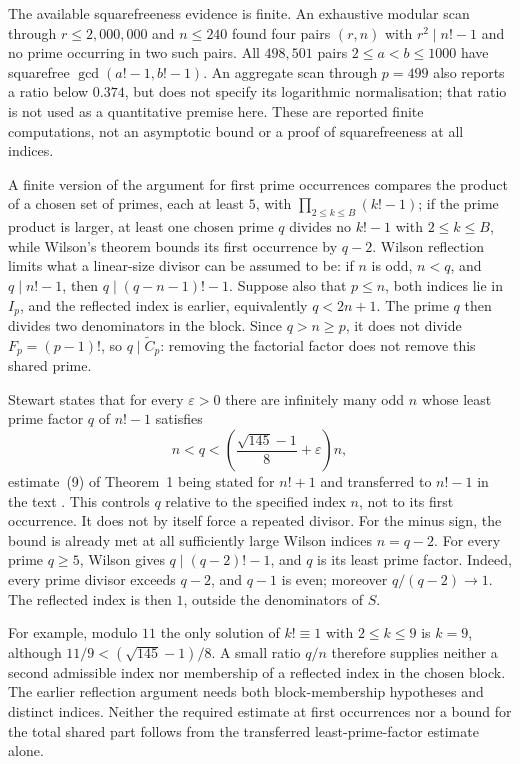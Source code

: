 \documentclass[11pt]{article}
\begin{document}
The available squarefreeness evidence is finite. An exhaustive modular scan through
$r\le2{,}000{,}000$ and $n\le240$ found four pairs $(r,n)$ with $r^2\mid n!-1$ and no
prime occurring in two such pairs.  All $498{,}501$ pairs $2\le a<b\le1000$ have
squarefree $\gcd(a!-1,b!-1)$. An aggregate scan through $p=499$ also reports a ratio below
$0.374$, but does not specify its logarithmic normalisation; that ratio is
not used as a quantitative premise here. These are reported finite
computations, not an asymptotic bound or a proof of squarefreeness at all
indices.

A finite version of the argument for first prime occurrences compares the product of a
chosen set of primes, each at least $5$, with $\prod_{2\le k\le B}(k!-1)$; if
the prime product is larger, at least one chosen prime $q$ divides no $k!-1$ with $2\le k\le B$,
while Wilson's theorem bounds its first occurrence by $q-2$.  Wilson reflection
limits what a linear-size divisor can be assumed to be: if $n$ is odd,
$n<q$, and $q\mid n!-1$, then $q\mid(q-n-1)!-1$. Suppose also that
$p\le n$, both indices lie in $I_p$, and the reflected index is earlier,
equivalently $q<2n+1$. The prime $q$ then divides two denominators in the
block. Since $q>n\ge p$, it does not divide $F_p=(p-1)!$, so
$q\mid\widetilde C_p$: removing the factorial factor does not remove this
shared prime.

Stewart states that for every $\varepsilon>0$ there are infinitely many odd
$n$ whose least prime factor $q$ of $n!-1$ satisfies
\[
 n<q<\left(\frac{\sqrt{145}-1}{8}+\varepsilon\right)n ,
\]
estimate~(9) of Theorem~1 being stated for $n!+1$ \cite[p.~463]{stewart2004}
and transferred to $n!-1$ in the text \cite[p.~464]{stewart2004}.  This controls $q$ relative to the specified index $n$, not to its first
occurrence. It does not by itself force a repeated divisor. For the minus
sign, the bound is already met at all sufficiently large Wilson indices
$n=q-2$. For every prime $q\ge5$, Wilson gives $q\mid(q-2)!-1$, and $q$ is its least prime
factor. Indeed, every prime divisor exceeds $q-2$, and $q-1$ is even;
moreover $q/(q-2)\to1$. The reflected index is then $1$, outside the denominators of $S$.

For example, modulo $11$ the only solution of $k!\equiv1$ with
$2\le k\le9$ is $k=9$, although $11/9<(\sqrt{145}-1)/8$.
A small ratio $q/n$ therefore supplies neither a second admissible index nor
membership of a reflected index in the chosen block. The earlier
reflection argument needs both block-membership hypotheses and distinct
indices. Neither the required estimate at first occurrences nor a bound
for the total shared part follows from the transferred least-prime-factor
estimate alone.
\end{document}
